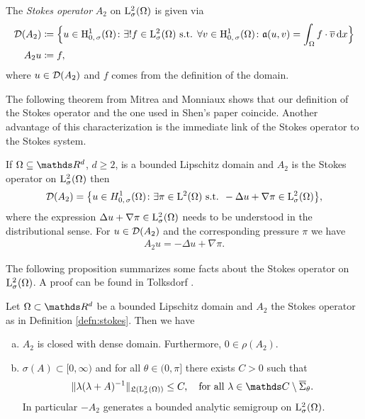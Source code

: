 \begin{defn}
  \label{defn:stokes}
  The \emph{Stokes operator} $A_2$ on $\mathrm{L}_\sigma^2(\Omega)$ is given via
  \begin{align*}
    \mathcal{D}(A_2) &\coloneqq \Big\{ u \in \mathrm{H}_{0,\,\sigma}^1(\Omega) \colon \exists ! f \in \mathrm{L}^2_\sigma(\Omega) \text{ s.t. } \forall v \in \mathrm{H}_{0,\,\sigma}^1(\Omega) \colon \mathfrak{a}(u,v) = \int_\Omega f \cdot \overline v \, {\operatorname{d}\!{x}} \Big\} \\
    A_2 u &\coloneqq f,
  \end{align*}
  where $u \in \mathcal{D}(A_2)$ and $f$ comes from the definition of the domain.
\end{defn}

The following theorem from Mitrea and Monniaux \cite[Thm.\@~4]{mitreaMonniaux} shows that our definition of the Stokes operator and the one used in Shen's paper \cite{Shen2012} coincide. 
Another advantage of this characterization is the immediate link of the Stokes operator to the Stokes system.

\begin{thm}
  \label{thm:stokesOperatorL2}
  If $\Omega \subseteq \R^d$, $d \geq 2$, is a bounded Lipschitz domain and $A_2$ is the Stokes operator on $\mathrm{L}^2_\sigma(\Omega)$ then
  \begin{align*}
    \mathcal{D}(A_2) = \big\{ u \in H^1_{0,\,\sigma}(\Omega) \colon \exists \pi \in \mathrm{L}^2(\Omega) \text{ s.t. } -\Delta u + \nabla \pi \in \mathrm{L}^2_\sigma(\Omega) \big\},
  \end{align*}
  where the expression $\Delta u + \nabla \pi \in\mathrm{L}^2_\sigma(\Omega)$ needs to be understood in the distributional sense.
  For $u \in \mathcal{D}(A_2)$ and the corresponding pressure $\pi$ we have
  \begin{align*}
    A_2 u = -\Delta u + \nabla \pi.
  \end{align*}
\end{thm}

The following proposition summarizes some facts about the Stokes operator on $\mathrm{L}^2_\sigma(\Omega)$. A proof can be found in Tolksdorf \cite[Prop.\@~5.2.5]{tolksdorf}.

\begin{prop}
  \label{prop:stokesOperatorL2}
  Let $\Omega \subset \R^d$ be a bounded Lipschitz domain and $A_2$ the Stokes operator as in Definition \ref{defn:stokes}. Then we have
  \begin{enumerate}[a)]
    \item $A_2$ is closed with dense domain. Furthermore, $0 \in \rho(A_2)$.
    \item $\sigma(A) \subset [0,\infty)$ and for all $\theta \in (0,\pi]$ there exists $C > 0$ such that
      \begin{align}
        \label{eq:resolventEstimateL2}
        \| \lambda(\lambda + A)^{-1} \|_{\Li(\Ell^2_\sigma(\Omega))} \leq C, \quad\text{for all } \lambda \in \C \setminus \overline \Sigma_\theta.
      \end{align}
      In particular $-A_2$ generates a bounded analytic semigroup on $\mathrm{L}^2_\sigma(\Omega)$.
  \end{enumerate}
\end{prop}


